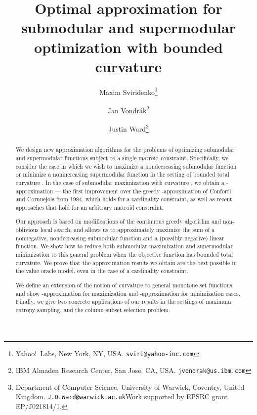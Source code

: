 \documentclass{article}
\author{Maxim Sviridenko\thanks{Yahoo!\ Labs, New York, NY, USA.  \texttt{sviri@yahoo-inc.com}} \and Jan Vondr\'ak\thanks{IBM Almaden Research Center, San Jose, CA, USA.  \texttt{jvondrak@us.ibm.com}} \and Justin Ward\thanks{Department of Computer Science, University of Warwick, Coventry, United Kingdom. \texttt{J.D.Ward@warwick.ac.uk}\enspace Work supported by EPSRC grant EP/J021814/1.}}
\title{Optimal approximation for submodular and supermodular optimization with bounded curvature}
\theoremstyle{definition}
\begin{document}
\maketitle

\setcounter{page}{1}

\begin{abstract}
We design new approximation algorithms for the problems of optimizing submodular and supermodular functions subject to a single matroid constraint.  Specifically, we consider the case in which we wish to maximize a nondecreasing submodular function or minimize a nonincreasing supermodular function in the setting of bounded total curvature . In the case of submodular maximization with curvature , we obtain a -approximation --- the first improvement over the greedy -approximation of Conforti and Cornuejols from 1984, which holds for a cardinality constraint, as well as recent approaches that hold for an arbitrary matroid constraint.  

Our approach is based on modifications of the continuous greedy algorithm and non-oblivious local search,  and allows us to approximately maximize the sum of a nonnegative, nondecreasing submodular function and a (possibly negative) linear function.  We show how to reduce both submodular maximization and supermodular minimization to this general problem when the objective function has bounded total curvature.
We prove that the approximation results we obtain are the best possible in the value oracle model, even in the case of a cardinality constraint. 

We define an extension of the notion of curvature to general monotone set functions and show -approximation for maximization and -approximation for minimization cases.   Finally, we give two concrete applications of our results in the settings of maximum entropy sampling, and the column-subset selection problem.
\end{abstract}


\newcommand{\submod}{g}
\newcommand{\lin}{\ell}
\newcommand{\obj}{f}
\newcommand{\submodExt}{G}
\newcommand{\linExt}{L}
\newcommand{\objExt}{F}
\newcommand{\ground}{X}
\newcommand{\I}{\mathcal{I}}
\newcommand{\M}{\mathcal{M}}
\newcommand{\bases}[1]{\mathcal{B}(#1)}
\newcommand{\conv}{\mathrm{conv}}
\newcommand{\rank}[1]{r_{#1}}
\newcommand{\chr}[1]{\mathbf{1}_{#1}}
\newcommand{\cR}{R}

\newcommand{\linmax}{\hat{v}_\lin}
\newcommand{\submodmax}{\hat{v}_\submod}
\newcommand{\vmax}{\hat{v}}
\newcommand{\emax}{\hat{e}}
\newcommand{\elinmax}{\hat{e}_\lin}
\newcommand{\esubmodmax}{\hat{e}_\submod}
\end{document}
